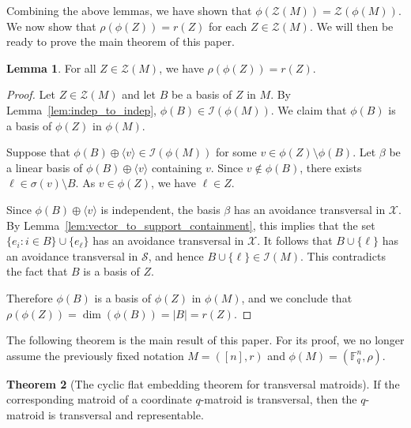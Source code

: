 \documentclass{article}
\theoremstyle{definition}
\newtheorem{theorem}{Theorem}[section]
\newtheorem{lemma}[theorem]{{{Lemma}}}
\begin{document}
Combining the above lemmas, we have shown that $\phi(\mathcal{Z}(M))=\mathcal{Z}(\phi(M))$. We now show that $\rho(\phi(Z))=r(Z)$ for each $Z\in\mathcal{Z}(M)$. We will then be ready to prove the main theorem of this paper.

\begin{lemma}\label{lem:ranks_agree}
    For all $Z\in\mathcal{Z}(M)$, we have $\rho(\phi(Z))=r(Z)$.
\end{lemma}

\begin{proof}
    Let $Z\in\mathcal{Z}(M)$ and let $B$ be a basis of $Z$ in $M$. By Lemma~\ref{lem:indep_to_indep}, $\phi(B)\in\mathcal{I}(\phi(M))$. We claim that $\phi(B)$ is a basis of $\phi(Z)$ in $\phi(M)$.

    Suppose that $\phi(B)\oplus\langle v\rangle\in\mathcal{I}(\phi(M))$ for some $v\in \phi(Z)\setminus \phi(B)$. Let $\beta$ be a linear basis of $\phi(B)\oplus\langle v\rangle$ containing $v$. Since $v\notin\phi(B)$, there exists $\ell\in\sigma(v)\setminus B$. As $v\in\phi(Z)$, we have $\ell\in Z$.

    Since $\phi(B)\oplus\langle v\rangle$ is independent, the basis $\beta$ has an avoidance transversal in $\mathcal{X}$. By Lemma~\ref{lem:vector_to_support_containment}, this implies that the set $\{e_i:i\in B\}\cup\{e_\ell\}$ has an avoidance transversal in $\mathcal{X}$. It follows that $B\cup\{\ell\}$ has an avoidance transversal in $\mathcal{S}$, and hence $B\cup\{\ell\}\in\mathcal{I}(M)$. This contradicts the fact that $B$ is a basis of $Z$.

    Therefore $\phi(B)$ is a basis of $\phi(Z)$ in $\phi(M)$, and we conclude that
    $\rho(\phi(Z))=\dim(\phi(B))=|B|=r(Z)$.
\end{proof}

The following theorem is the main result of this paper. For its proof, we no longer assume the previously fixed notation $M=([n],r)$ and $\phi(M)=(\mathbb{F}_q^n,\rho)$.

\begin{theorem}[The cyclic flat embedding theorem for transversal matroids]\label{thm:cyc_flat_embedding}
    If the corresponding matroid of a coordinate $q$-matroid is transversal, then the $q$-matroid is transversal and representable.
\end{theorem}
\end{document}
